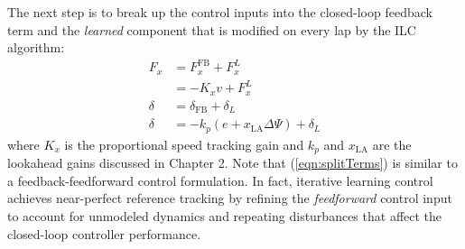 The next step is to break up the control inputs into the closed-loop feedback term and the \textit{learned} component that is
modified on every lap by the ILC algorithm:
\begin{align}
\label{eqn:splitTerms}
F_x &= F^{\mathrm{FB}}_x + F^L_x\\
    &= -K_xv + F^L_x\\
\delta &= \delta_{\mathrm{FB}} + \delta_L\\
\delta &= -k_p(e + x_\mathrm{LA}\Delta\Psi) + \delta_L
\end{align}
where $K_x$ is the proportional speed tracking gain and $k_p$ and $x_\mathrm{LA}$ are the lookahead gains discussed in Chapter 2. Note
that (\ref{eqn:splitTerms}) is similar to a feedback-feedforward control formulation. In fact, iterative learning control achieves
near-perfect reference tracking by refining the \textit{feedforward} control input to account for unmodeled dynamics and repeating disturbances that
affect the closed-loop controller performance. 

